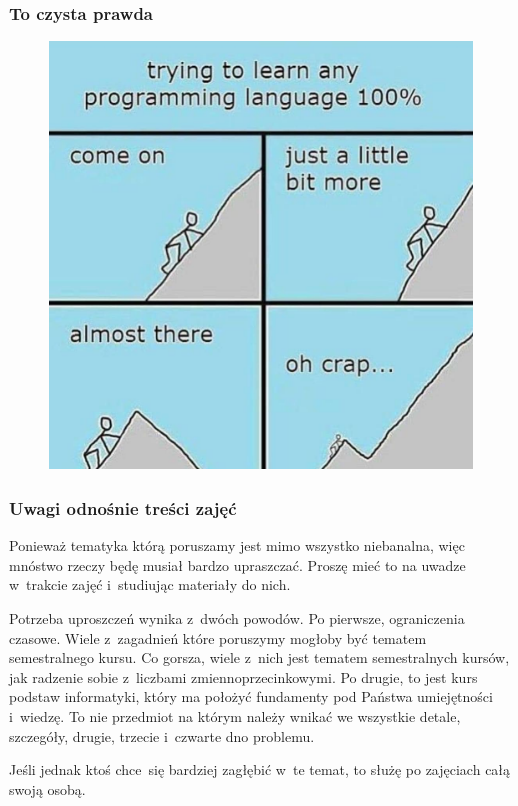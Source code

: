\documentclass[10pt,t]{beamer}
\begin{document}
\begin{frame}
  \frametitle{To czysta prawda}


  \begin{figure}

    \label{fig:Learning-any-language-at-100-procent}

    \centering


    \includegraphics[scale=0.19]
    {./Presentations-pictures/Learning-language-at-100.jpg}

  \end{figure}

\end{frame}





\begin{frame}
  \frametitle{Uwagi odnośnie treści zajęć}


  Ponieważ tematyka którą poruszamy jest mimo wszystko niebanalna, więc
  mnóstwo rzeczy będę musiał bardzo \alert{upraszczać}. Proszę mieć to na
  uwadze w~trakcie zajęć i~studiując materiały do nich.

  Potrzeba uproszczeń wynika z~dwóch powodów. Po pierwsze, ograniczenia
  czasowe. Wiele z~zagadnień które poruszymy mogłoby być tematem
  semestralnego kursu. Co gorsza, wiele z~nich \alert{jest} tematem
  semestralnych kursów, jak radzenie sobie z~liczbami zmiennoprzecinkowymi.
  Po drugie, to jest kurs \alert{podstaw} informatyki, który ma położyć
  fundamenty pod Państwa umiejętności i~wiedzę. To nie przedmiot na którym
  należy wnikać we wszystkie detale, szczegóły, drugie, trzecie i~czwarte
  dno problemu.

  Jeśli jednak ktoś chce~się bardziej zagłębić w~te temat, to służę po
  zajęciach całą swoją osobą.

\end{frame}
\end{document}
